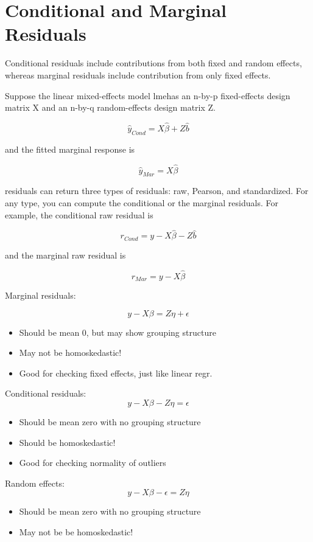 \documentclass[Chap5amain.tex]{subfiles}
\begin{document}
\section{Conditional and Marginal Residuals}
Conditional residuals include contributions from both fixed and random effects, whereas marginal residuals include contribution from only fixed effects.

Suppose the linear mixed-effects model lmehas an n-by-p fixed-effects design matrix X and an n-by-q random-effects design matrix Z. 


\[ \hat{y}_{Cond} = X \hat{\beta} + Z \hat{b} \]

and the fitted marginal response is


\[ \hat{y}_{Mar} = X \hat{\beta} \]

residuals can return three types of residuals: raw, Pearson, and standardized. For any type, you can compute the conditional or the marginal residuals. For example, the conditional raw residual is


\[ r_{Cond} = y - X \hat{\beta} - Z \hat{b} \]

and the marginal raw residual is



\[ r_{Mar} = y - X \hat{\beta} \]

\newpage

Marginal residuals:

\[y - X\beta = Z \eta +\epsilon \]
\begin{itemize}
\item
Should be mean 0, but may show grouping structure
\item
May not be homoskedastic!
\item
Good for checking fixed effects, just like linear regr.
\end{itemize}
Conditional residuals:
\[y - X\beta - Z \eta = \epsilon \]
\begin{itemize}
\item
Should be mean zero with no grouping structure
\item
Should be homoskedastic!
\item
Good for checking normality of outliers
\end{itemize}

Random effects:
\[y - X\beta -\epsilon = Z \eta \]
\begin{itemize}
\item
Should be mean zero with no grouping structure
\item
May not be be homoskedastic!
\end{itemize}
\end{document}
